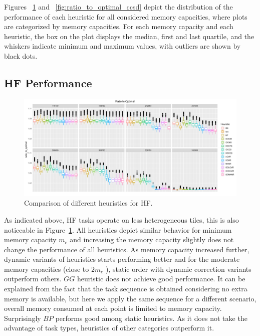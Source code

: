 \documentclass[sigconf]{acmart}
\begin{document}
{		
		Figures ~\ref{fig:ratio_to_optimal_hf} and ~\ref{fig:ratio_to_optimal_ccsd} depict the distribution of the performance of each heuristic for all considered memory capacities, where plots are categorized by memory capacities. For each memory capacity and each heuristic, the box on the plot displays the median, first and last quartile, and the whiskers indicate minimum and maximum values, with outliers are shown by black dots.
		\subsection{HF Performance}	
		\begin{figure}[htb]
			\includegraphics[scale=0.5]{./all-binpack/ratio_to_optimal_selected_hf.pdf}
			\caption{Comparison of different heuristics for HF.}
			\label{fig:ratio_to_optimal_hf}
		\end{figure}
		As indicated above, HF tasks operate on less heterogeneous tiles, this is also noticeable in Figure~\ref{fig:ratio_to_optimal_hf}. All heuristics depict similar behavior for minimum memory capacity $m_c$ and increasing the memory capacity slightly does not change the performance of all heuristics. As memory capacity increased further, dynamic variants of heuristics starts performing better and for the moderate memory capacities (close to $2m_c$ ), static order with dynamic correction variants outperform others. $GG$ heuristic does not achieve good performance. It can be explained from the fact that the task sequence is obtained considering no extra memory is available, but here we apply the same sequence for a different scenario, overall memory consumed at each point is limited to memory capacity. Surprisingly $BP$ performs good among static heuristics.  As it does not take the advantage of task types,  heuristics of other categories outperform it.
		
}
\end{document}
